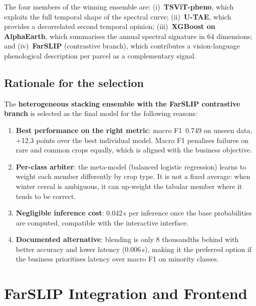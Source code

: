 \documentclass{article}
\begin{document}
The four members of the winning ensemble are: (i)~\textbf{TSViT-pheno},
which exploits the full temporal shape of the spectral curve;
(ii)~\textbf{U-TAE}, which provides a decorrelated second temporal opinion;
(iii)~\textbf{XGBoost on AlphaEarth}, which summarises the annual spectral
signature in 64 dimensions; and (iv)~\textbf{FarSLIP} (contrastive
branch), which contributes a vision-language phenological description per
parcel as a complementary signal.

\subsection{Rationale for the selection}

The \textbf{heterogeneous stacking ensemble with the FarSLIP contrastive
branch} is selected as the final model for the following reasons:

\begin{enumerate}[leftmargin=*]
    \item \textbf{Best performance on the right metric}: macro F1~0.749
    on unseen data, +12.3 points over the best individual model. Macro
    F1 penalises failures on rare and common crops equally, which is
    aligned with the business objective.

    \item \textbf{Per-class arbiter}: the meta-model (balanced logistic
    regression) learns to weight each member differently by crop type.
    It is not a fixed average: when winter cereal is ambiguous, it can
    up-weight the tabular member where it tends to be correct.

    \item \textbf{Negligible inference cost}: 0.042\,s per inference once
    the base probabilities are computed, compatible with the interactive
    interface.

    \item \textbf{Documented alternative}: blending is only 8 thousandths
    behind with better accuracy and lower latency (0.006\,s), making it
    the preferred option if the business prioritises latency over macro F1
    on minority classes.
\end{enumerate}

\section{FarSLIP Integration and Frontend}
\end{document}
